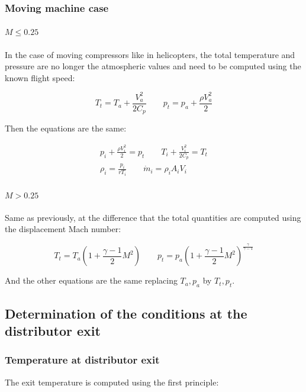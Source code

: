 \subsubsection{Moving machine case}
\paragraph{$M \leq 0.25$}
In the case of moving compressors like in helicopters, the total temperature and pressure are no longer the atmospheric values and need to be computed using the known flight speed: 

\begin{equation}
T_t = T_a + \frac{V_a^2}{2C_p} \qquad p_t = p_a + \frac{\rho V_a^2}{2}
\end{equation}

Then the equations are the same: 

\begin{equation}
\begin{aligned}
p_i + \frac{\rho V_i^2}{2} = p_t \qquad T_i + \frac{V_i^2}{2C_p}= T_t\\
\rho _i = \frac{p_i}{rT_i} \qquad \dot{m}_i = \rho _iA_iV_i
\end{aligned}
\end{equation}

\paragraph{$M>0.25$}
Same as previously, at the difference that the total quantities are computed using the displacement Mach number: 

\begin{equation}
T_t = T_a \left(1+ \frac{\gamma -1}{2}M^2 \right) \qquad p_t = p_a \left(1+ \frac{\gamma -1}{2}M^2 \right)^{\frac{\gamma}{\gamma -1}}
\end{equation}

And the other equations are the same replacing $T_a, p_a$ by $T_t, p_t$. 

\subsection{Determination of the conditions at the distributor exit}
\subsubsection{Temperature at distributor exit}
The exit temperature is computed using the first principle: 

